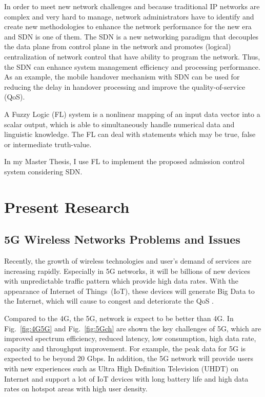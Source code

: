 \documentclass[graybox]{svmult}
\begin{document}
	In order to meet new network challenges and because traditional IP networks are complex and very hard to manage, network administrators have to identify and create new methodologies to enhance the network performance for the new era and SDN is one of them.  The SDN is a new networking paradigm that decouples the data plane from control plane in the network and promotes (logical) centralization of network control that have ability to program the network. Thus, the SDN can enhance system management efficiency and processing performance. As an example, the mobile handover mechanism with SDN can be used for reducing the delay in handover processing and improve the quality-of-service (QoS).
	
	A Fuzzy Logic (FL) system is a nonlinear mapping of an input data vector into a scalar output,  which is able to simultaneously handle numerical data and linguistic knowledge. The FL can deal with statements which may be true, false or intermediate truth-value.
	
	In my Master Thesis, I use FL to implement the proposed admission control system considering SDN.







\section{Present Research}\label{sec:Present Research}
\subsection{5G Wireless Networks Problems and Issues}
Recently, the growth of wireless technologies and user's demand of services are increasing rapidly. Especially in 5G networks, it will be billions of new devices with unpredictable traffic pattern which provide high data rates. With the appearance of Internet of Things~(IoT), these devices will generate Big Data to the Internet, which will cause to congest and deteriorate the QoS \cite{8985528}.

Compared to the 4G, the 5G, network is expect to be better than 4G. In Fig.~\ref{fig:4G5G} and Fig.~\ref{fig:5Gch} are shown the key challenges of 5G, which are improved  spectrum efficiency, reduced latency, low consumption, high data rate, capacity and throughput improvement. For example, the peak data for 5G is expected to be beyond 20 Gbps. In addition, the 5G network will provide users with new experiences such as Ultra High Definition Television (UHDT) on Internet and support a lot of IoT devices with long battery life and high data rates on hotspot areas with high user density.
\end{document}

